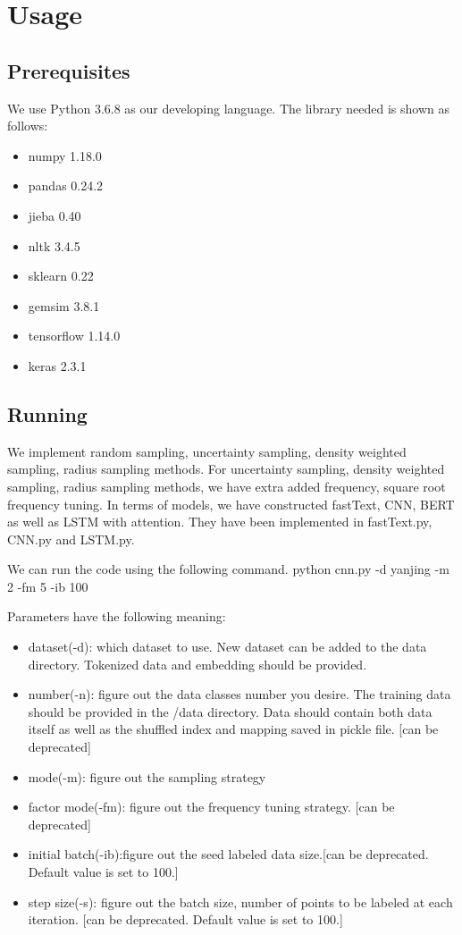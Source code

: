 \section{Usage}
\label{sec:usage}
\subsection{Prerequisites}
We use Python 3.6.8 as our developing language. The library needed is shown as follows:
\begin{itemize}
    \item numpy 1.18.0
    \item pandas 0.24.2
    \item jieba 0.40
    \item nltk 3.4.5
    \item sklearn 0.22
    \item gemsim 3.8.1
    \item tensorflow 1.14.0
    \item keras 2.3.1
\end{itemize}
\subsection{Running}
We implement random sampling, uncertainty sampling,  density weighted sampling, radius sampling methods. For uncertainty sampling,  density weighted sampling, radius sampling methods, we have extra added frequency, square root frequency tuning. In terms of models, we have constructed fastText, CNN, BERT as well as LSTM with attention. They have been implemented in fastText.py, CNN.py and LSTM.py.

We can run the code using the following command. 
python cnn.py -d yanjing -m 2 -fm 5 -ib 100

Parameters have the following meaning:
\begin{itemize}
    \item dataset(-d): which dataset to use. New dataset can be added to the data directory. Tokenized data and embedding should be provided.
    \item number(-n): figure out the data classes number you desire. The training data should be provided in the /data directory. Data should contain both data itself as well as  the shuffled index and mapping saved in pickle file. [can be deprecated]
    \item mode(-m): figure out the sampling strategy
    \item factor mode(-fm): figure out the frequency tuning strategy. [can be deprecated]
    \item initial batch(-ib):figure out the seed labeled data size.[can be deprecated. Default value is set to 100.]
    \item step size(-s): figure out the batch size, number of points to be labeled at each iteration. [can be deprecated. Default value is set to 100.]
\end{itemize}

